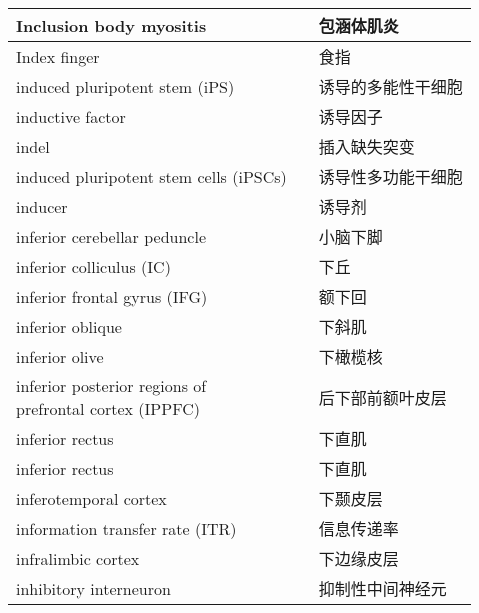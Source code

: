 \begin{longtable}{lll}
	\midrule
	Inclusion body myositis  && 包涵体肌炎  \\
	
	\midrule
	Index finger  && 食指  \\
	
	\midrule
	induced pluripotent stem (iPS)  && 诱导的多能性干细胞  \\
	
	\midrule
	inductive factor  && 诱导因子  \\
	
	\midrule
	indel   && 插入缺失突变  \\
	
	\midrule
	induced pluripotent stem cells (iPSCs)  && 诱导性多功能干细胞  \\
	
	\midrule
	inducer  && 诱导剂  \\
	
	\midrule \label{term:inferior_cerebellar_peduncel}
	inferior cerebellar peduncle   && 小脑下脚  \\
	
	\midrule
	inferior colliculus (IC)   && 下丘  \\
	
	\midrule
	inferior frontal gyrus (IFG)   && 额下回  \\
	
	\midrule
	inferior oblique   && 下斜肌  \\
	
	\midrule
	inferior olive   && 下橄榄核  \\
	
	\midrule
	\makecell[l]{inferior posterior regions of \\ prefrontal cortex (IPPFC)}  && 后下部前额叶皮层  \\
	
	\midrule
	inferior rectus   && 下直肌  \\
	
	\midrule
	inferior rectus   && 下直肌  \\
	
	\midrule
	inferotemporal cortex   && 下颞皮层  \\
	
	\midrule
	information transfer rate (ITR)   && 信息传递率  \\
	
	\midrule
	infralimbic cortex   && 下边缘皮层  \\
	
	\midrule
	inhibitory interneuron  && 抑制性中间神经元  \\
	

\end{longtable}
